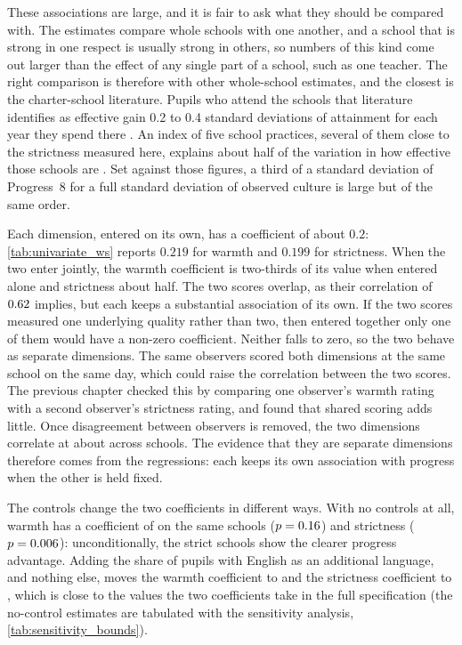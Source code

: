 These associations are large, and it is fair to ask what they should be compared with. The estimates compare whole schools with one another, and a school that is strong in one respect is usually strong in others, so numbers of this kind come out larger than the effect of any single part of a school, such as one teacher. The right comparison is therefore with other whole-school estimates, and the closest is the charter-school literature. Pupils who attend the schools that literature identifies as effective gain 0.2 to 0.4 standard deviations of attainment for each year they spend there \citep{abdulkadiroglu2011,angrist2010}. An index of five school practices, several of them close to the strictness measured here, explains about half of the variation in how effective those schools are \citep{dobbie2013}. Set against those figures, a third of a standard deviation of Progress~8 for a full standard deviation of observed culture is large but of the same order.

Each dimension, entered on its own, has a coefficient of about $0.2$: \cref{tab:univariate_ws} reports $0.219$ for warmth and $0.199$ for strictness.
When the two enter jointly, the warmth coefficient is two-thirds of its value when entered alone
and strictness about half. The two scores overlap, as their correlation of $0.62$ implies, but each keeps a substantial association of its own. If the two scores measured one underlying quality rather than two, then entered together only one of them would have a non-zero coefficient. Neither falls to zero, so the two behave as separate dimensions. The same observers scored both dimensions at the same school on the same day, which could raise the correlation between the two scores. The previous chapter checked this by comparing one observer's warmth rating with a second observer's strictness rating, and found that shared scoring adds little. Once disagreement between observers is removed, the two dimensions correlate at about \CorrWSTrueSchool{} across schools. The evidence that they are separate dimensions therefore comes from the regressions: each keeps its own association with progress when the other is held fixed.



The controls change the two coefficients in different ways. With no controls at all, warmth has a coefficient of
\SensShortW{} on the same schools ($p = 0.16$) and strictness
\SensShortS{} ($p = 0.006$): unconditionally, the strict
schools show the clearer progress advantage. Adding the share of
pupils with English as an additional language, and nothing else, moves the
warmth coefficient to \SensShortEalW{} and the strictness coefficient to
\SensShortEalS{}, which is close to the values the two coefficients take in the full specification
(the no-control estimates are tabulated with the sensitivity analysis, \cref{tab:sensitivity_bounds}).

